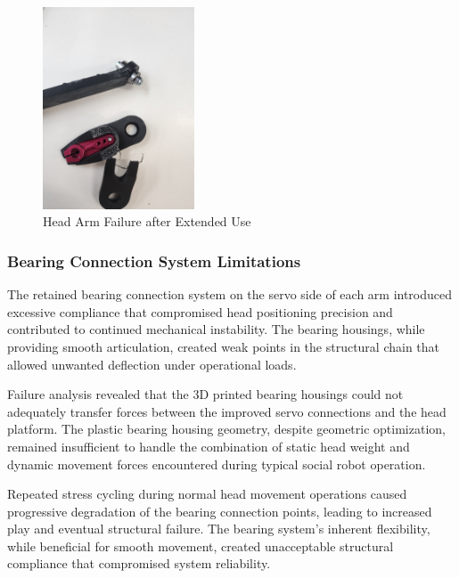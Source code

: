\begin{figure}[H]
    \centering
    \includegraphics[height=6cm, angle=-90]{Images/HeadArmFailure (2).jpg}
    \caption{Head Arm Failure after Extended Use}
    \label{fig:head_arm_failure}
\end{figure}

\subsubsection{Bearing Connection System Limitations}

The retained bearing connection system on the servo side of each arm introduced excessive compliance that compromised head positioning precision and contributed to continued mechanical instability. The bearing housings, while providing smooth articulation, created weak points in the structural chain that allowed unwanted deflection under operational loads.

Failure analysis revealed that the 3D printed bearing housings could not adequately transfer forces between the improved servo connections and the head platform. The plastic bearing housing geometry, despite geometric optimization, remained insufficient to handle the combination of static head weight and dynamic movement forces encountered during typical social robot operation.

Repeated stress cycling during normal head movement operations caused progressive degradation of the bearing connection points, leading to increased play and eventual structural failure. The bearing system's inherent flexibility, while beneficial for smooth movement, created unacceptable structural compliance that compromised system reliability.

